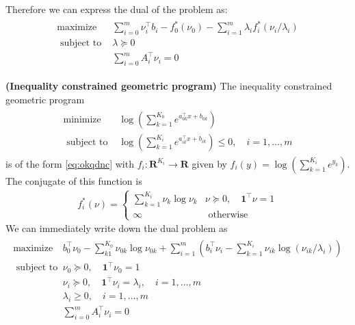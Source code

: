 \documentclass{article}
\newcommand{\bfs}[1]{\textbf{({#1}) }}
\begin{document}
Therefore we can express the dual of the problem as:
\begin{align*}
\begin{array}{ll}
\operatorname{maximize} & \sum_{i=0}^{m} \nu_{i}^{\top} b_{i}-f_{0}^{*}\left(\nu_{0}\right)-\sum_{i=1}^{m} \lambda_{i} f_{i}^{*}\left(\nu_{i} / \lambda_{i}\right) \\
\text { subject to } & \lambda \succeq 0 \\
& \sum_{i=0}^{m} A_{i}^{\top} \nu_{i}=0
\end{array}
\end{align*}
\begin{exma}\bfs{Inequality constrained geometric program}
The inequality constrained geometric program
\begin{align*}
\begin{array}{ll}
\operatorname{minimize} & \log \left(\sum_{k=1}^{K_{0}} e^{a_{0 k}^{\top} x+b_{0 k}}\right) \\
\text { subject to } & \log \left(\sum_{k=1}^{K_{i}} e^{a_{i k}^{\top} x+b_{i k}}\right) \leq 0, \quad i=1, \ldots, m
\end{array}
\end{align*}
is of the form \cref{eq:okqdnc} with $f_{i}: \mathbf{R}^{K_{i}} \rightarrow \mathbf{R}$ given by $f_{i}(y)=\log \left(\sum_{k=1}^{K_{i}} e^{y_{k}}\right)$. The conjugate of this function is
\begin{align*}
f_{i}^{*}(\nu)= \begin{cases}\sum_{k=1}^{K_{i}} \nu_{k} \log \nu_{k} & \nu \succeq 0, \quad \mathbf{1}^{\top} \nu=1 \\ \infty & \text { otherwise }\end{cases}
\end{align*}
We can immediately write down the dual problem as
\begin{align*}
\begin{array}{ll}
\operatorname{maximize} & b_{0}^{\top} \nu_{0}-\sum_{k \overline{1}}^{K_{0}} \nu_{0 k} \log \nu_{0 k}+\sum_{i=1}^{m}\left(b_{i}^{\top} \nu_{i}-\sum_{k=1}^{K_{i}} \nu_{i k} \log \left(\nu_{i k} / \lambda_{i}\right)\right) \\
\text { subject to } & \nu_{0} \succeq 0, \quad \mathbf{1}^{\top} \nu_{0}=1 \\
& \nu_{i} \succeq 0, \quad \mathbf{1}^{\top} \nu_{i}=\lambda_{i}, \quad i=1, \ldots, m \\
& \lambda_{i} \geq 0, \quad i=1, \ldots, m \\
& \sum_{i=0}^{m} A_{i}^{\top} \nu_{i}=0
\end{array}

\end{align*}
\end{exma}
\end{document}

